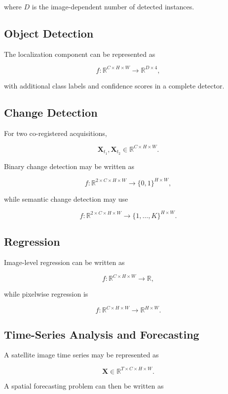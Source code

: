 \documentclass[
    11pt,
    a4paper,
    parskip=half,
    bibliography=totoc,
    numbers=noenddot
]{scrartcl}
\begin{document}
where \(D\) is the image-dependent number of detected instances.

\subsection{Object Detection}

The localization component can be represented as

\[
f:
\mathbb{R}^{C\times H\times W}
\rightarrow
\mathbb{R}^{D\times 4},
\]

with additional class labels and confidence scores in a complete detector.

\subsection{Change Detection}

For two co-registered acquisitions,

\[
\mathbf{X}_{t_1},\mathbf{X}_{t_2}
\in
\mathbb{R}^{C\times H\times W}.
\]

Binary change detection may be written as

\[
f:
\mathbb{R}^{2\times C\times H\times W}
\rightarrow
\{0,1\}^{H\times W},
\]

while semantic change detection may use

\[
f:
\mathbb{R}^{2\times C\times H\times W}
\rightarrow
\{1,\ldots,K\}^{H\times W}.
\]

\subsection{Regression}

Image-level regression can be written as

\[
f:
\mathbb{R}^{C\times H\times W}
\rightarrow
\mathbb{R},
\]

while pixelwise regression is

\[
f:
\mathbb{R}^{C\times H\times W}
\rightarrow
\mathbb{R}^{H\times W}.
\]

\subsection{Time-Series Analysis and Forecasting}

A satellite image time series may be represented as

\[
\mathbf{X}
\in
\mathbb{R}^{T\times C\times H\times W}.
\]

A spatial forecasting problem can then be written as
\end{document}

